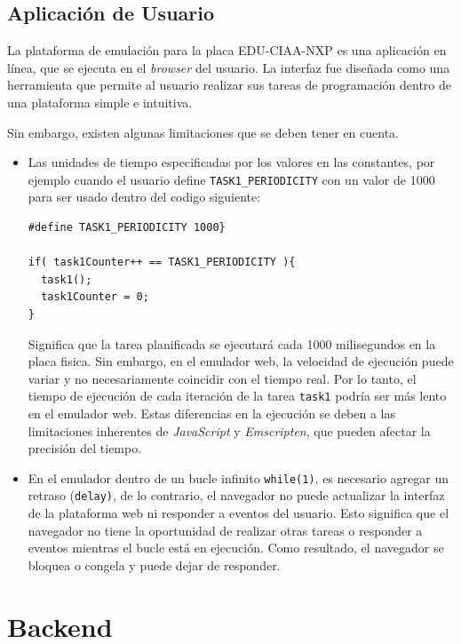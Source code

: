 \subsection{Aplicación de Usuario}
La plataforma de emulación para la placa EDU-CIAA-NXP es una aplicación en línea, que se ejecuta en el \textit{browser} del usuario. La interfaz fue diseñada como una herramienta que permite al usuario realizar sus tareas de programación dentro de una plataforma simple e intuitiva.

Sin embargo, existen algunas limitaciones que se deben tener en cuenta.

\begin{itemize}
	\item Las unidades de tiempo especificadas por los valores en las constantes, por ejemplo cuando el usuario define \texttt{TASK1\_PERIODICITY} con un valor de 1000 para ser usado dentro del codigo siguiente: 
	
\begin{lstlisting}[caption={Ejemplo TASK1\_PERIODICITY}]
#define TASK1_PERIODICITY 1000} 

if( task1Counter++ == TASK1_PERIODICITY ){
  task1();
  task1Counter = 0;
}
\end{lstlisting}	
	


Significa que la tarea  planificada se ejecutará cada 1000 milisegundos en la placa fisica. Sin embargo, en el emulador web, la velocidad de ejecución puede variar y no necesariamente coincidir con el tiempo real. Por lo tanto, el tiempo de ejecución de cada iteración de la tarea \texttt{task1} podría ser más lento en el emulador web. Estas diferencias en la ejecución se deben a las limitaciones inherentes de \textit{JavaScript} y \textit{Emscripten}, que pueden afectar la precisión del tiempo.

	\item En el emulador dentro de un bucle infinito \texttt{while(1)}, es necesario agregar un retraso (\texttt{delay)}, de lo contrario, el navegador no puede actualizar la interfaz de la plataforma web ni responder a eventos del usuario. Esto significa que el navegador no tiene la oportunidad de realizar otras tareas o responder a eventos mientras el bucle está en ejecución. Como resultado, el navegador se bloquea o congela y puede dejar de responder.
	
\end{itemize}


\section{Backend}

